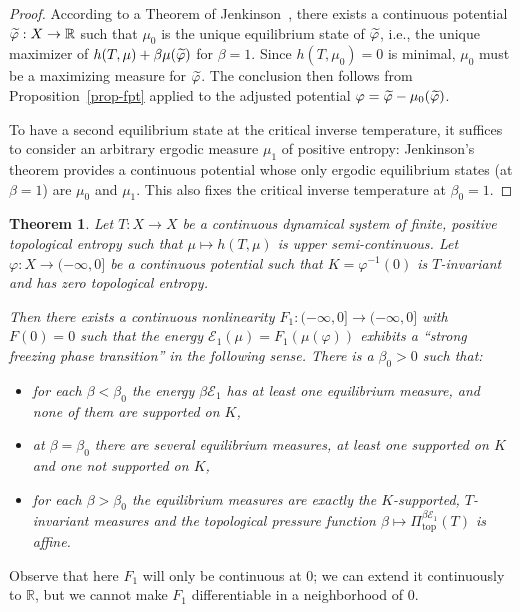 \documentclass[10pt]{amsart}
\newtheorem{theo}{Theorem}[section]
\theoremstyle{definition}\newtheorem{defi}[theo]{Definition}\newtheorem{rema}[theo]{Remark}\newtheorem{exam}[theo]{Example}\newtheorem{exem}[theo]{Example}\newtheorem{nota}[theo]{Notation}
\theoremstyle{plain}
\theoremstyle{plain}
\newcommand\NLP{\Pi}
\renewcommand\top{{\mathrm{top}}}
\newcommand{\pot}{\varphi}
\newcommand*\8{\infty}
\newcommand\RR{\mathbb{R}}
\newcommand{\En}{\mathcal{E}}
\let\oldtilde\tilde
\renewcommand*{\tilde}[1]{\mathchoice{\widetilde{#1}}{\widetilde{#1}}{\oldtilde{#1}}{\oldtilde{#1}}}
\begin{document}
\begin{proof}
According to a Theorem of Jenkinson~\cite{Jenkinson}, there exists a continuous potential $\tilde\pot:X\to\RR$ such that $\mu_0$ is the unique equilibrium state of $\tilde\pot$, i.e., the unique maximizer of $h(T,\mu)+\beta\mu(\tilde\pot)$ for $\beta=1$. Since $h(T,\mu_0)=0$ is minimal, $\mu_0$ must be a maximizing measure for $\tilde\pot$. The conclusion then follows from Proposition~\ref{prop-fpt} applied to the adjusted potential $\pot=\tilde\pot-\mu_0(\tilde\pot)$.

To have a second equilibrium state at the critical inverse temperature, it suffices to consider an arbitrary ergodic measure $\mu_1$ of positive entropy: Jenkinson's theorem provides a continuous potential whose only ergodic equilibrium states (at $\beta=1$) are $\mu_0$ and $\mu_1$. This also fixes the critical inverse temperature at $\beta_0=1$.
\end{proof}

\begin{theo}\label{thm-fpt-nonlinear}
Let $T:X\to X$ be a continuous dynamical system of finite, positive topological entropy such that $\mu\mapsto h(T,\mu)$ is upper semi-continuous. Let $\pot:X\to(-\infty,0]$ be a continuous potential such that $K=\pot^{-1}(0)$ is $T$-invariant and has zero topological entropy.

Then there exists a continuous nonlinearity $F_1 : (-\infty,0]\to (-\infty,0]$ with $F(0)=0$ such that the energy $\En_1(\mu) = F_1(\mu(\pot))$ exhibits a ``strong freezing phase transition'' in the following sense. There is a $\beta_0>0$ such that:
\begin{itemize}
\item for each $\beta<\beta_0$ the energy $\beta \En_1$ has at least one equilibrium measure, and none of them are supported on $K$,
\item at $\beta=\beta_0$ there are several equilibrium measures, at least one supported on $K$ and one not supported on $K$,
\item for each $\beta>\beta_0$ the equilibrium measures are exactly the $K$-supported, $T$-invariant measures and the topological pressure function $\beta\mapsto \NLP^{\beta\En_1}_\top(T)$ is affine.
\end{itemize}
\end{theo}

Observe that here $F_1$ will only be continuous at $0$; we can extend it continuously to $\RR$, but we cannot make $F_1$ differentiable in a neighborhood of $0$.
\end{document}
